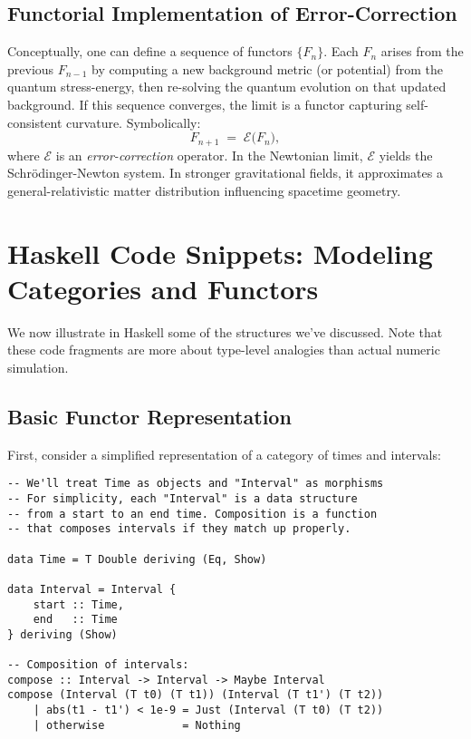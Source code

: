 \documentclass[12pt]{article}
\begin{document}
\subsection{Functorial Implementation of Error-Correction}
Conceptually, one can define a sequence of functors \(\{F_n\}\). Each \(F_n\) arises from the previous \(F_{n-1}\) by computing a new background metric (or potential) from the quantum stress-energy, then re-solving the quantum evolution on that updated background. If this sequence converges, the limit is a functor capturing self-consistent curvature. Symbolically:
\[
F_{n+1} \;=\;\mathcal{E}\bigl(F_{n}\bigr),
\]
where \(\mathcal{E}\) is an \emph{error-correction} operator. In the Newtonian limit, \(\mathcal{E}\) yields the Schr\"odinger-Newton system. In stronger gravitational fields, it approximates a general-relativistic matter distribution influencing spacetime geometry.

\section{Haskell Code Snippets: Modeling Categories and Functors}
We now illustrate in Haskell some of the structures we've discussed. Note that these code fragments are more about type-level analogies than actual numeric simulation.

\subsection{Basic Functor Representation}
First, consider a simplified representation of a category of times and intervals:

\begin{lstlisting}[caption={Category of Time in Haskell (simplified)}]
-- We'll treat Time as objects and "Interval" as morphisms
-- For simplicity, each "Interval" is a data structure
-- from a start to an end time. Composition is a function
-- that composes intervals if they match up properly.

data Time = T Double deriving (Eq, Show)

data Interval = Interval {
    start :: Time,
    end   :: Time
} deriving (Show)

-- Composition of intervals:
compose :: Interval -> Interval -> Maybe Interval
compose (Interval (T t0) (T t1)) (Interval (T t1') (T t2))
    | abs(t1 - t1') < 1e-9 = Just (Interval (T t0) (T t2))
    | otherwise            = Nothing
\end{lstlisting}
\end{document}
